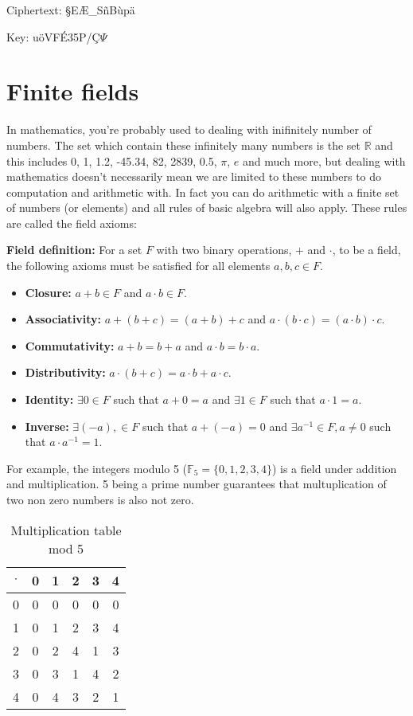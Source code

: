 \documentclass{article}
\begin{document}
\medskip

Ciphertext: \textquotesingle§EÆ\_SñBùpä

Key: uöVFÉ35P/Ç$\Psi$


\section{Finite fields}

In mathematics, you're probably used to dealing with inifinitely number of
numbers. The set which contain these infinitely many numbers is the
set $\mathbb{R}$ and this includes 0, 1, 1.2, -45.34, 82, 2839, 0.5, $\pi$, $e$
and much more, but dealing with mathematics doesn't necessarily mean
we are limited to these numbers to do computation and
arithmetic with. In fact you can do arithmetic with a finite set of numbers (or elements) and all rules of basic algebra will also apply. These rules are called
the field axioms:

\textbf{Field definition:} For a set \(F\) with two binary operations, \(+\) and \(\cdot\), to be a field, the following axioms must be satisfied for all elements \(a,b,c\in F\).

\begin{itemize}
    \item \textbf{Closure:} $a+b \in F$ and $a\cdot b \in F$.
    \item \textbf{Associativity:} $a+(b+c) = (a+b)+c$ and $a\cdot (b\cdot c) = (a\cdot b)\cdot c$.
    \item \textbf{Commutativity:} $a+b = b+a$ and $a\cdot b = b\cdot a$.
    \item \textbf{Distributivity:} $a\cdot (b +c) = a\cdot b + a\cdot c$.
    \item \textbf{Identity:} $\exists 0 \in F$ such that $a+0=a$ and $\exists 1 \in F$ such that $a\cdot 1=a$.
    \item \textbf{Inverse:} $\exists(-a),\in F$ such that $a+(-a) = 0$ and $\exists a^{-1}\in F, a \neq 0$ such that $a\cdot a^{-1} = 1$.
\end{itemize}

For example, the integers modulo 5 ($\mathbb{F}_5 = \{ 0, 1, 2, 3, 4 \}$)
is a field under addition and multiplication. 5 being a prime number
guarantees that multuplication of two non zero numbers is also not
zero. 

\begin{table}[!hp]
\centering
  \begin{tabular}{c|ccccc}
  $\cdot$ & 0 & 1 & 2 & 3 & 4\\
  \hline
  0 & 0 & 0 & 0 & 0 & 0 \\
  1 & 0 & \cellcolor{yellow!50}1 & 2 & 3 & 4\\
  2 & 0 & 2 & 4 & \cellcolor{yellow!50}1 & 3 \\
  3 & 0 & 3 & \cellcolor{yellow!50}1 & 4 & 2 \\
  4 & 0 & 4 & 3 & 2 & \cellcolor{yellow!50}1 \\
\end{tabular}
  \caption{Multiplication table mod 5}
\end{table}
\end{document}
